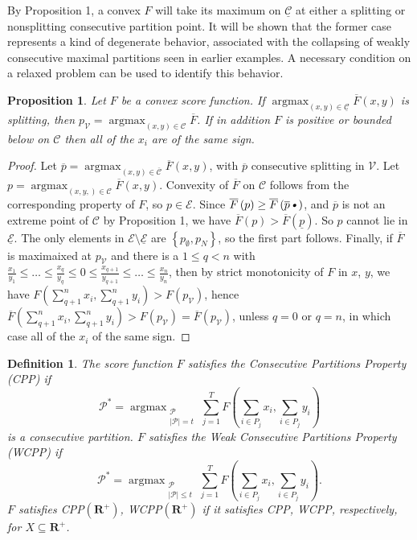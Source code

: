 \documentclass{article}
\newtheorem{definition}{Definition}
\newtheorem{prop}{Proposition}
\theoremstyle{case}
\DeclareMathOperator*{\argmax}{argmax} %
\begin{document}
By Proposition 1, a convex $F$ will take its maximum on $\underline{\mathcal{C}}$ at either a splitting or nonsplitting consecutive partition point. It will be shown that the former case represents a kind of degenerate behavior, associated with the collapsing of weakly consecutive maximal partitions seen in earlier examples. A necessary condition on a relaxed problem can be used to identify this behavior.

\begin{prop}
Let $F$ be a convex score function. If $\argmax_{\left( x,y\right) \in \underline{\mathcal{C}}} \overline{F}\left( x,y\right)$ is splitting, then $p_\mathcal{V} = \argmax_{\left( x,y\right) \in \mathcal{C}} \overline{F}$. If in addition $F$ is positive or bounded below on $\mathcal{C}$ then all of the $x_i$ are of the same sign.
\end{prop}
\begin{proof}
Let $\overline{p} = \argmax_{\left( x,y\right) \in \overline{\mathcal{C}}} \overline{F}\left( x,y\right)$, with $\overline{p}$ consecutive splitting in $\mathcal{V}$. Let $p = \argmax_{\left( x,y,\right) \in \mathcal{C}} \overline{F}\left( x,y\right)$. Convexity of $\overline{F}$ on $\mathcal{C}$ follows from the corresponding property of $F$, so $p \in \mathcal{E}$. Since $\overline{F}\left( p\right) \geq \overline{F}\left( \overline{p}\textsl{•}\right)$, and $\overline{p}$ is not an extreme point of $\mathcal{C}$ by Proposition 1, we have $\overline{F}\left( p\right) > \overline{F}\left( \underline{p}\right)$. So $p$ cannot lie in $\underline{\mathcal{E}}$. The only elements in $\mathcal{E}\setminus \underline{\mathcal{E}}$ are $\left\lbrace p_{\emptyset}, p_{N}\right\rbrace$, so the first part follows. Finally, if $\overline{F}$ is maximaixed at $p_\mathcal{V}$ and there is a $1 \leq q < n$ with $\frac{x_1}{y_1} \leq \dots \leq \frac{x_q}{y_q} \leq 0 \leq \frac{x_{q+1}}{y_{q+1}} \leq \dots \leq \frac{x_n}{y_n}$, then by strict monotonicity of $F$ in $x$, $y$, we have $F\left( \sum_{q+1}^n x_i, \sum_{q+1}^n y_i\right) > F\left( p_\mathcal{V}\right)$, hence $\overline{F}\left( \sum_{q+1}^n x_i, \sum_{q+1}^n y_i\right) > F\left( p_\mathcal{V}\right) = \overline{F}\left( p_\mathcal{V}\right)$, unless $q = 0$ or $q = n$, in which case all of the $x_i$ of the same sign.
\end{proof}

\begin{definition}
The score function $F$ satisfies the Consecutive Partitions Property (CPP) if 
\[
\mathcal{P}^* = \argmax_{\substack{\mathcal{P} \\ \vert \mathcal{P}\vert = t}} {\sum\limits_{j=1}^{T}F( \sum_{i \in P_j}x_i, \sum_{i \in P_j}y_i)}
\]
is a consecutive partition. $F$ satisfies the Weak Consecutive Partitions Property (WCPP) if 
\[
\mathcal{P}^* = \argmax_{\substack{\mathcal{P} \\ \vert \mathcal{P}\vert \leq t}} {\sum\limits_{j=1}^{T}F( \sum_{i \in P_j}x_i, \sum_{i \in P_j}y_i)}.
\]
$F$ satisfies CPP$(\mathbf{R}^+)$, WCPP$(\mathbf{R}^+)$ if it satisfies CPP, WCPP, respectively, for $X \subseteq \mathbf{R}^+$.
\end{definition}
\end{document}

